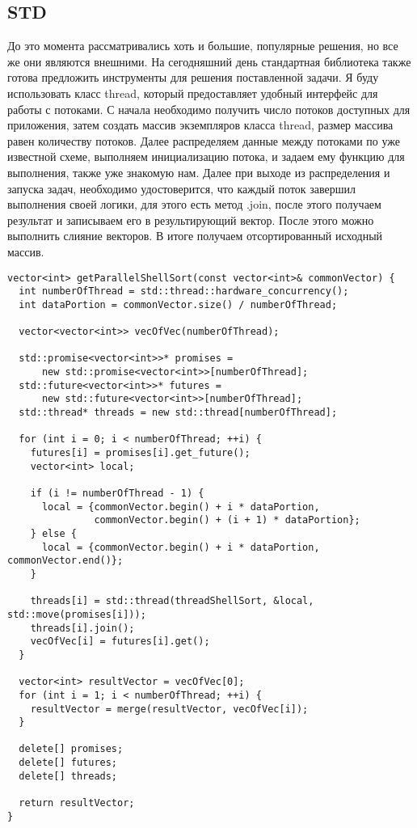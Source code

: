 \documentclass{report}
\begin{document}
\subsection*{STD}
\par До это момента рассматривались хоть и большие, популярные решения, но все же они являются внешними. На сегодняшний день стандартная библиотека также готова предложить инструменты для решения поставленной задачи. Я буду использовать класс thread, который предоставляет удобный интерфейс для работы с потоками. С начала необходимо получить число потоков доступных для приложения, затем создать массив экземпляров класса thread, размер массива равен количеству потоков. Далее распределяем данные между потоками по уже известной схеме, выполняем инициализацию потока, и задаем ему функцию для выполнения, также уже знакомую нам. Далее при выходе из распределения и запуска задач, необходимо удостоверится, что каждый поток завершил выполнения своей логики, для этого есть метод .join, после этого получаем результат и записываем его в результирующий вектор. После этого можно выполнить слияние векторов. В итоге получаем отсортированный исходный массив.

\begin{lstlisting}
vector<int> getParallelShellSort(const vector<int>& commonVector) {
  int numberOfThread = std::thread::hardware_concurrency();
  int dataPortion = commonVector.size() / numberOfThread;

  vector<vector<int>> vecOfVec(numberOfThread);

  std::promise<vector<int>>* promises =
      new std::promise<vector<int>>[numberOfThread];
  std::future<vector<int>>* futures =
      new std::future<vector<int>>[numberOfThread];
  std::thread* threads = new std::thread[numberOfThread];

  for (int i = 0; i < numberOfThread; ++i) {
    futures[i] = promises[i].get_future();
    vector<int> local;

    if (i != numberOfThread - 1) {
      local = {commonVector.begin() + i * dataPortion,
               commonVector.begin() + (i + 1) * dataPortion};
    } else {
      local = {commonVector.begin() + i * dataPortion, commonVector.end()};
    }

    threads[i] = std::thread(threadShellSort, &local, std::move(promises[i]));
    threads[i].join();
    vecOfVec[i] = futures[i].get();
  }

  vector<int> resultVector = vecOfVec[0];
  for (int i = 1; i < numberOfThread; ++i) {
    resultVector = merge(resultVector, vecOfVec[i]);
  }

  delete[] promises;
  delete[] futures;
  delete[] threads;

  return resultVector;
}
\end{lstlisting}
\end{document}
